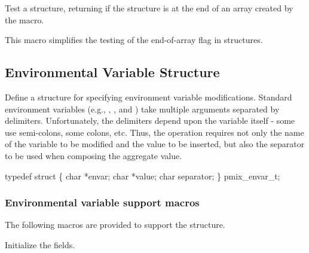 
Test a  structure, returning  if the structure is at the end of an array created by the  macro.


\begin{arglist}
\end{arglist}

This macro simplifies the testing of the end-of-array flag in  structures.

\subsection{Environmental Variable Structure}

Define a structure for specifying environment variable modifications.
Standard environment variables (e.g., , , and )
take multiple arguments separated by delimiters. Unfortunately, the delimiters
depend upon the variable itself - some use semi-colons, some colons, etc. Thus,
the operation requires not only the name of the variable to be modified and
the value to be inserted, but also the separator to be used when composing
the aggregate value.

\cspecificstart
\begin{codepar}
typedef struct \{
    char *envar;
    char *value;
    char separator;
\} pmix_envar_t;
\end{codepar}
\cspecificend

\subsubsection{Environmental variable support macros}

The following macros are provided to support the  structure.


Initialize the  fields.

